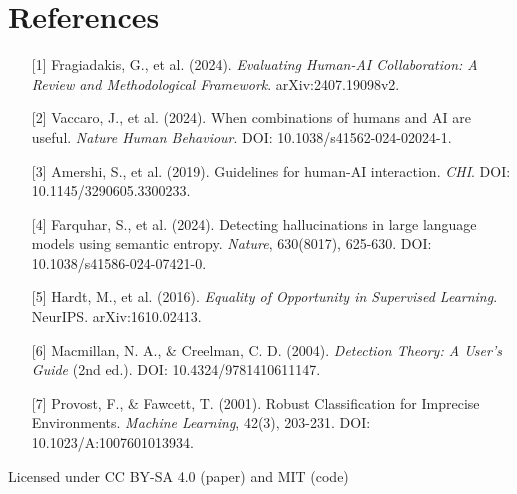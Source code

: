 \documentclass[a4paper]{article}
\begin{document}
\section{References}
\begin{enumerate}
    \item[{[1]}] Fragiadakis, G., et al. (2024). \textit{Evaluating Human-AI Collaboration: A Review and Methodological Framework}. arXiv:2407.19098v2.
    \item[{[2]}] Vaccaro, J., et al. (2024). When combinations of humans and AI are useful. \textit{Nature Human Behaviour}. DOI: 10.1038/s41562-024-02024-1.
    \item[{[3]}] Amershi, S., et al. (2019). Guidelines for human-AI interaction. \textit{CHI}. DOI: 10.1145/3290605.3300233.
    \item[{[4]}] Farquhar, S., et al. (2024). Detecting hallucinations in large language models using semantic entropy. \textit{Nature}, 630(8017), 625-630. DOI: 10.1038/s41586-024-07421-0.
    \item[{[5]}] Hardt, M., et al. (2016). \textit{Equality of Opportunity in Supervised Learning}. NeurIPS. arXiv:1610.02413.
    \item[{[6]}] Macmillan, N. A., \& Creelman, C. D. (2004). \textit{Detection Theory: A User's Guide} (2nd ed.). DOI: 10.4324/9781410611147.
    \item[{[7]}] Provost, F., \& Fawcett, T. (2001). Robust Classification for Imprecise Environments. \textit{Machine Learning}, 42(3), 203-231. DOI: 10.1023/A:1007601013934.
\end{enumerate}

Licensed under CC BY-SA 4.0 (paper) and MIT (code)
\end{document}
